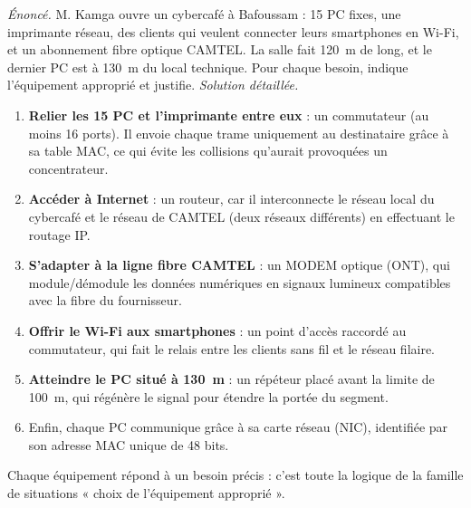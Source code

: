 \documentclass[11pt]{article}
\newcommand{\cle}[1]{{\popxbold\color{popdark}#1}}
\begin{document}
\begin{exoresolu}
\emph{Énoncé.} M. Kamga ouvre un cybercafé à Bafoussam : 15 PC fixes, une imprimante réseau, des clients qui veulent connecter leurs smartphones en Wi-Fi, et un abonnement fibre optique CAMTEL. La salle fait \SI{120}{\meter} de long, et le dernier PC est à \SI{130}{\meter} du local technique. Pour chaque besoin, indique l'équipement approprié et justifie.
\tcblower
\emph{Solution détaillée.}
\begin{enumerate}
\item \textbf{Relier les 15 PC et l'imprimante entre eux} : un \cle{commutateur} (au moins 16 ports). Il envoie chaque trame uniquement au destinataire grâce à sa table MAC, ce qui évite les collisions qu'aurait provoquées un concentrateur.
\item \textbf{Accéder à Internet} : un \cle{routeur}, car il interconnecte le réseau local du cybercafé et le réseau de CAMTEL (deux réseaux différents) en effectuant le routage IP.
\item \textbf{S'adapter à la ligne fibre CAMTEL} : un \cle{MODEM} optique (ONT), qui module/démodule les données numériques en signaux lumineux compatibles avec la fibre du fournisseur.
\item \textbf{Offrir le Wi-Fi aux smartphones} : un \cle{point d'accès} raccordé au commutateur, qui fait le relais entre les clients sans fil et le réseau filaire.
\item \textbf{Atteindre le PC situé à \SI{130}{\meter}} : un \cle{répéteur} placé avant la limite de \SI{100}{\meter}, qui régénère le signal pour étendre la portée du segment.
\item Enfin, chaque PC communique grâce à sa \cle{carte réseau} (NIC), identifiée par son adresse MAC unique de 48 bits.
\end{enumerate}
Chaque équipement répond à un besoin précis : c'est toute la logique de la famille de situations « choix de l'équipement approprié ».
\end{exoresolu}
\end{document}
